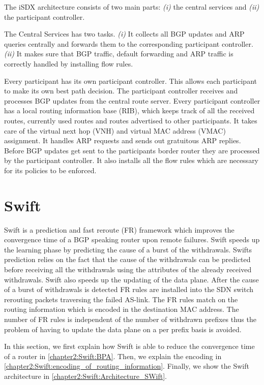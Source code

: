 The iSDX architecture consists of two main parts: \emph{(i)} the central services and \emph{(ii)} the participant controller.

The Central Services has two tasks. \emph{(i)} It collects all BGP updates and ARP queries centrally and forwards them to the corresponding participant controller. \emph{(ii)} It makes sure that BGP traffic, default forwarding and ARP traffic is correctly handled by installing flow rules.

Every participant has its own participant controller. This allows each participant to make its own best path decision. The participant controller receives and processes BGP updates from the central route server. Every participant controller has a local routing information base (RIB), which keeps track of all the received routes, currently used routes and routes advertised to other participants. It takes care of the virtual next hop (VNH) and virtual MAC address (VMAC) assignment. It handles ARP requests and sends out gratuitous ARP replies. Before BGP updates get sent to the participants border router they are processed by the participant controller. It also installs all the flow rules which are necessary for its policies to be enforced.

\newpage

\section{\label{chapter2:Swift}Swift}

Swift is a prediction and fast reroute (FR) framework which improves the convergence time of a BGP speaking router upon remote failures. Swift speeds up the learning phase by predicting the cause of a burst of the withdrawals. Swifts prediction relies on the fact that the cause of the withdrawals can be predicted before receiving all the withdrawals using the attributes of the already received withdrawals. Swift also speeds up the updating of the data plane. After the cause of a burst of withdrawals is detected FR rules are installed into the SDN switch rerouting packets traversing the failed AS-link. The FR rules match on the routing information which is encoded in the destination MAC address. The number of FR rules is independent of the number of withdrawn prefixes thus the problem of having to update the data plane on a per prefix basis is avoided.

In this section, we first explain how Swift is able to reduce the convergence time of a router in \ref{chapter2:Swift:BPA}. Then, we explain the encoding in \ref{chapter2:Swift:encoding_of_routing_information}. Finally, we show the Swift architecture in \ref{chapter2:Swift:Architecture_SWift}.

